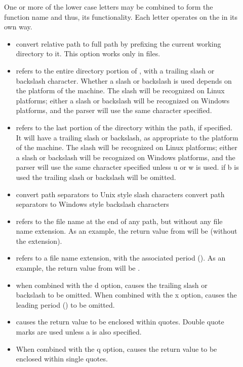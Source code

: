 \begin{description}
\item []
One or more of the lower case letters may be combined to form the
function name and thus, its functionality.
Each letter operates on the  in its own way.
\begin{itemize}
  \item {} convert relative path to full path by prefixing the current working directory to it.
This option works only in  files.
  \item {} refers to the entire directory portion of ,
with a trailing slash or backslash character.
Whether a slash or backslash is used depends on the platform of
the machine.
The slash will be recognized on Linux platforms;
either a slash or backslash will be recognized on Windows platforms,
and the parser will use the same character specified.
  \item {} refers to the last portion of the directory within the path,
if specified.
It will have a trailing slash or backslash, 
as appropriate to the platform of the machine.
The slash will be recognized on Linux platforms;
either a slash or backslash will be recognized on Windows platforms,
and the parser will use the same character specified unless u or w is used.
if b is used the trailing slash or backslash will be omitted.
  \item {} convert path separators to Unix style slash characters
  \Item {} convert path separators to Windows style backslash characters
  \item {} refers to the file name at the end of any path,
but without any file name extension.
As an  example, the return value from 
will be  (without the  extension).
  \item {} refers to a file name extension, with the associated
period ().
As an  example, the return value from 
will be .
  \item {} when combined with the d option, causes the trailing slash or backslash to
be omitted. When combined with the x option, causes the leading period () to be omitted.
  \item {} causes the return value to be enclosed within quotes. Double
quote marks are used unless a is also specified.
  \item {} When combined with the q option, causes the return value to be enclosed within single quotes.
\end{itemize}


\end{description}
